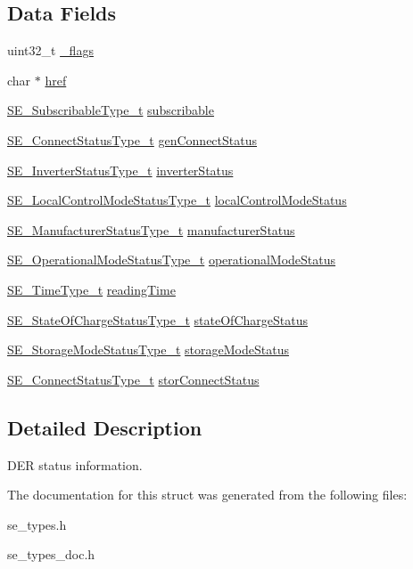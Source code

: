 \subsection*{Data Fields}
\begin{DoxyCompactItemize}
\item 
uint32\+\_\+t \hyperlink{group__DERStatus_gab4c1e1321c0115d4bf5b67665d12f296}{\+\_\+flags}
\item 
char $\ast$ \hyperlink{group__DERStatus_ga412be5b1d9e2bcc7acff42c20bec4f2d}{href}
\item 
\hyperlink{group__SubscribableType_ga5c41f553d369710ed34619266bf2551e}{S\+E\+\_\+\+Subscribable\+Type\+\_\+t} \hyperlink{group__DERStatus_ga6880d05b460ec1817d4bda4904674639}{subscribable}
\item 
\hyperlink{structSE__ConnectStatusType__t}{S\+E\+\_\+\+Connect\+Status\+Type\+\_\+t} \hyperlink{group__DERStatus_ga9e187f594a02795f7901a8536eaf93fd}{gen\+Connect\+Status}
\item 
\hyperlink{structSE__InverterStatusType__t}{S\+E\+\_\+\+Inverter\+Status\+Type\+\_\+t} \hyperlink{group__DERStatus_ga5c07bcc9536a224372b681863babfa29}{inverter\+Status}
\item 
\hyperlink{structSE__LocalControlModeStatusType__t}{S\+E\+\_\+\+Local\+Control\+Mode\+Status\+Type\+\_\+t} \hyperlink{group__DERStatus_ga5ff487916a297613474b4be108121256}{local\+Control\+Mode\+Status}
\item 
\hyperlink{structSE__ManufacturerStatusType__t}{S\+E\+\_\+\+Manufacturer\+Status\+Type\+\_\+t} \hyperlink{group__DERStatus_ga4d93047bbc5c2f04885400ca75e35d7e}{manufacturer\+Status}
\item 
\hyperlink{structSE__OperationalModeStatusType__t}{S\+E\+\_\+\+Operational\+Mode\+Status\+Type\+\_\+t} \hyperlink{group__DERStatus_ga8db3dd530b0cbb5e02d952f763b30dd4}{operational\+Mode\+Status}
\item 
\hyperlink{group__TimeType_ga6fba87a5b57829b4ff3f0e7638156682}{S\+E\+\_\+\+Time\+Type\+\_\+t} \hyperlink{group__DERStatus_gaced41f46b4b7e97358567bf65f377339}{reading\+Time}
\item 
\hyperlink{structSE__StateOfChargeStatusType__t}{S\+E\+\_\+\+State\+Of\+Charge\+Status\+Type\+\_\+t} \hyperlink{group__DERStatus_ga288cbcbc32535bf38ed8931c49103c4b}{state\+Of\+Charge\+Status}
\item 
\hyperlink{structSE__StorageModeStatusType__t}{S\+E\+\_\+\+Storage\+Mode\+Status\+Type\+\_\+t} \hyperlink{group__DERStatus_gae47ec69bc3ff69a8b5f7b36e49f4aed9}{storage\+Mode\+Status}
\item 
\hyperlink{structSE__ConnectStatusType__t}{S\+E\+\_\+\+Connect\+Status\+Type\+\_\+t} \hyperlink{group__DERStatus_ga008c4b8df0ff5f20ee6ffc4336bda96e}{stor\+Connect\+Status}
\end{DoxyCompactItemize}


\subsection{Detailed Description}
D\+ER status information. 

The documentation for this struct was generated from the following files\+:\begin{DoxyCompactItemize}
\item 
se\+\_\+types.\+h\item 
se\+\_\+types\+\_\+doc.\+h\end{DoxyCompactItemize}
